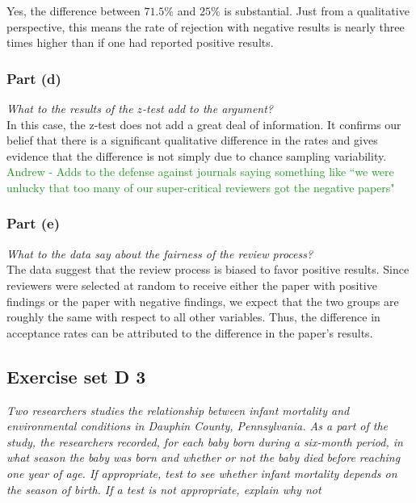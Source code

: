 \documentclass[11pt]{article}
\begin{document}
Yes, the difference between $71.5\%$ and $25\%$ is substantial.  Just from a qualitative perspective, this means the rate of rejection with negative results is nearly three times higher than if one had reported positive results.


\subsubsection*{Part (d)}
\textit{What to the results of the $z$-test add to the argument?}\\

In this case, the z-test does not add a great deal of information.  It confirms our belief that there is a significant qualitative difference in the rates and gives evidence that the difference is not simply due to chance sampling variability.\\

\textcolor{ForestGreen}{Andrew - Adds to the defense against journals saying something like ``we were unlucky that too many of our super-critical reviewers got the negative papers"}

\subsubsection*{Part (e)}
\textit{What to the data say about the fairness of the review process?}\\

The data suggest that the review process is biased to favor positive results.  Since reviewers were selected at random to receive either the paper with positive findings or the paper with negative findings, we expect that the two groups are roughly the same with respect to all other variables.  Thus, the difference in acceptance rates can be attributed to the difference in the paper's results.

\subsection*{Exercise set D 3} %
\textit{Two researchers studies the relationship between infant mortality and environmental conditions in Dauphin County, Pennsylvania. As a part of the study, the researchers recorded, for each baby born during a six-month period, in what season the baby was born and whether or not the baby died before reaching one year of age. If appropriate, test to see whether  infant mortality depends on the season of birth. If a test is not appropriate, explain why not}\\
\end{document}

